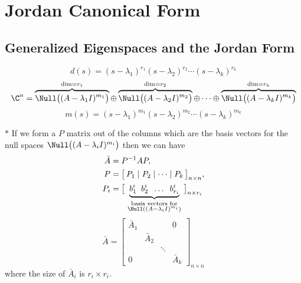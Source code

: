 \section{Jordan Canonical Form}\label{sec:jordan}
\subsection{Generalized Eigenspaces and the Jordan Form}\label{ss:gen-eigenspaces}
\begin{theorem}
\leavevmode{}%
\[ d(s)=(s-\lambda_1)^{r_1}(s-\lambda_2)^{r_2}\cdots(s-\lambda_k)^{r_k} \]
\[
\C^n=\overbrace{\Null\big((A-\lambda_1I)^{m_1}\big)}^{\dim=r_1}\oplus\overbrace{\Null\big((A-\lambda_2I)^{m_2}\big)}^{\dim=r_2}\oplus\cdots\oplus\overbrace{\Null\big((A-\lambda_kI)^{m_k}\big)}^{\dim=r_k}
\]
\[ m(s)=(s-\lambda_1)^{m_1}(s-\lambda_2)^{m_2}\cdots(s-\lambda_k)^{m_k} \]
\end{theorem}

$\ast$ If we form a $P$ matrix out of the columns which are the basis vectors for the null spaces $\Null\big((A-\lambda_iI)^{m_i}\big)$ then we can have
\begin{align*}
\bar A&=P^{-1}AP,\\
P&=\big[\,P_1\mid P_2\mid\dots\mid P_k\,\big]_{n\times n},\\
P_i&=\big[\,\underbrace{b_1^i\;\; b_2^i\;\;\dots\;\; b_{r_i}^i}_{\substack{\text{basis vectors for}\\ \Null((A-\lambda_iI)^{m_i})}}\,\big]_{n\times r_i}
\end{align*}
\[
\bar A=\begin{bmatrix}\bar A_1 & & & 0\\ & \bar A_2 & & \\ & & \ddots & \\ 0 & & & \bar A_k\end{bmatrix}_{n\times n}
\]
where the size of $\bar A_i$ is $r_i\times r_i$.

